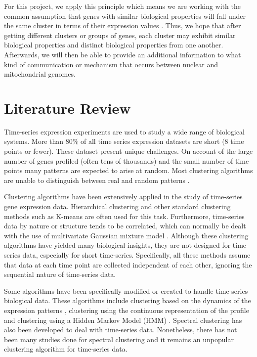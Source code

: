 For this project, we apply this principle which means we are working with the common assumption that genes with similar biological properties will fall under the same cluster in terms of their expression values \cite{Eisen14863}. Thus, we hope that after getting different clusters or groups of genes, each cluster may exhibit similar biological properties and distinct biological properties from one another. Afterwards, we will then be able to provide an additional information to what kind of communication or mechanism that occurs between nuclear and mitochondrial genomes.


\section{Literature Review}
Time-series expression experiments are used to study a wide range of biological systems. More than $80\%$ of all time series expression datasets are short ($8$ time points or fewer). These dataset present unique challenges. On account of the large number of genes profiled (often tens of thousands) and the small number of time points many patterns are expected to arise at random. Most clustering algorithms are unable to distinguish between real and random patterns \cite{Ernst2005}.

Clustering algorithms have been extensively applied in the study of time-series gene expression data. Hierarchical clustering \cite{Eisen14863} and other standard clustering methods such as K-means \cite{Duda73a} are often used for this task. Furthermore, time-series data by nature or structure tends to be correlated, which can normally be dealt with the use of multivariate Gaussian mixture model \cite{Eirola}. Although these clustering algorithms have yielded many biological insights, they are not designed for time-series data, especially for short time-series. Specifically, all these methods assume that data at each time point are collected independent of each other, ignoring the sequential nature of time-series data. 

Some algorithms have been specifically modified or created to handle time-series biological data. These algorithms include clustering based on the dynamics of the expression patterns \cite{Ramoni9121}, clustering using the continuous representation of the profile \cite{Bar-Joseph} and clustering using a Hidden Markov Model (HMM) \cite{Rabiner1989, Schliep2003}. Spectral clustering \cite{Wang} has also been developed to deal with time-series data. Nonetheless, there has not been many studies done for spectral clustering and it remains an unpopular clustering algorithm for time-series data.

